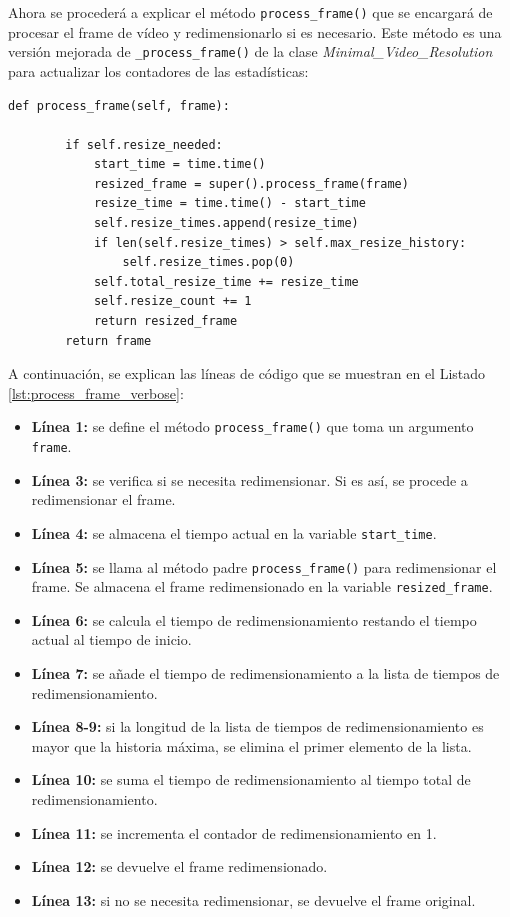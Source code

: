 Ahora se procederá a explicar el método \texttt{process\_frame()} que se encargará de procesar el frame de vídeo y redimensionarlo si es necesario. Este método es una versión mejorada de \texttt{\_process\_frame()} de la clase \textit{Minimal\_Video\_Resolution} para actualizar los contadores de las estadísticas:
\begin{lstlisting}[style=pythonstyle, caption={Método \texttt{process\_frame()} de \textit{Minimal\_Video\_Resolution\_verbose}.}, label={lst:process_frame_verbose}]
def process_frame(self, frame):
        
        if self.resize_needed:
            start_time = time.time()
            resized_frame = super().process_frame(frame)
            resize_time = time.time() - start_time
            self.resize_times.append(resize_time)
            if len(self.resize_times) > self.max_resize_history:
                self.resize_times.pop(0)
            self.total_resize_time += resize_time
            self.resize_count += 1
            return resized_frame
        return frame
\end{lstlisting}
\vspace{\baselineskip}

A continuación, se explican las líneas de código que se muestran en el Listado \ref{lst:process_frame_verbose}:
\begin{itemize}
    \item \textbf{Línea 1:} se define el método \texttt{process\_frame()} que toma un argumento \texttt{frame}.
    \item \textbf{Línea 3:} se verifica si se necesita redimensionar. Si es así, se procede a redimensionar el frame.
    \item \textbf{Línea 4:} se almacena el tiempo actual en la variable \texttt{start\_time}.
    \item \textbf{Línea 5:} se llama al método padre \texttt{process\_frame()} para redimensionar el frame. Se almacena el frame redimensionado en la variable \texttt{resized\_frame}.
    \item \textbf{Línea 6:} se calcula el tiempo de redimensionamiento restando el tiempo actual al tiempo de inicio.
    \item \textbf{Línea 7:} se añade el tiempo de redimensionamiento a la lista de tiempos de redimensionamiento.
    \item \textbf{Línea 8-9:} si la longitud de la lista de tiempos de redimensionamiento es mayor que la historia máxima, se elimina el primer elemento de la lista.
    \item \textbf{Línea 10:} se suma el tiempo de redimensionamiento al tiempo total de redimensionamiento.
    \item \textbf{Línea 11:} se incrementa el contador de redimensionamiento en 1.
    \item \textbf{Línea 12:} se devuelve el frame redimensionado.
    \item \textbf{Línea 13:} si no se necesita redimensionar, se devuelve el frame original.
\end{itemize}
\vspace{\baselineskip}

